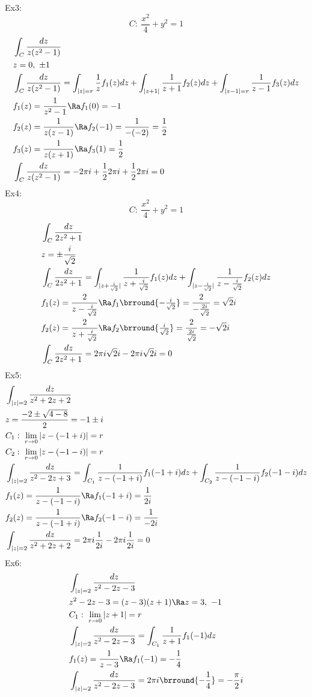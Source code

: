 Ex3:
\[
C:\ \frac{x^2}{4}+y^2=1
\]
\begin{align*}
    &\int_C\frac{dz}{z(z^2-1)}\\
    &z=0,\ \pm1\\
    &\int_C\frac{dz}{z(z^2-1)}=\int_{|z|=r}\frac{1}{z}f_1(z)dz+\int_{|z+1|}\frac{1}{z+1}f_2(z)dz+\int_{|z-1|=r}\frac{1}{z-1}f_3(z)dz\\
    &f_1(z)=\frac{1}{z^2-1}\Ra f_1(0)=-1\\
    &f_2(z)=\frac{1}{z(z-1)}\Ra f_2(-1)=\frac{1}{-(-2)}=\frac{1}{2}\\
    &f_3(z)=\frac{1}{z(z+1)}\Ra f_3(1)=\frac{1}{2}\\
    &\int_C\frac{dz}{z(z^2-1)}=-2\pi i+\frac{1}{2}2\pi i+\frac{1}{2}2\pi i=0
\end{align*}
Ex4:
\[
C:\ \frac{x^2}{4}+y^2=1
\]
\begin{align*}
    &\int_C\frac{dz}{2z^2+1}\\
    &z=\pm\frac{i}{\sqrt{2}}\\
    &\int_C\frac{dz}{2z^2+1}=\int_{|z+\frac{i}{\sqrt{2}}|}\frac{1}{z+\frac{i}{\sqrt{2}}}f_1(z)dz+\int_{|z-\frac{i}{\sqrt{2}}|}\frac{1}{z-\frac{i}{\sqrt{2}}}f_2(z)dz\\
    &f_1(z)=\frac{2}{z-\frac{i}{\sqrt{2}}}\Ra f_1\brround{-\tfrac{i}{\sqrt{2}}}=\frac{2}{-\frac{2i}{\sqrt{2}}}=\sqrt{2}i\\
    &f_2(z)=\frac{2}{z+\frac{i}{\sqrt{2}}}\Ra f_2\brround{\tfrac{i}{\sqrt{2}}}=\frac{2}{\frac{2i}{\sqrt{2}}}=-\sqrt{2}i\\
    &\int_C\frac{dz}{2z^2+1}=2\pi i\sqrt{2}i-2\pi i\sqrt{2}i=0
\end{align*}
Ex5:
\begin{align*}
    &\int_{|z|=2}\frac{dz}{z^2+2z+2}\\
    &z=\frac{-2\pm\sqrt{4-8}}{2}=-1\pm i\\
    &C_1:\ \lim_{r\to0}|z-(-1+i)|=r\\
    &C_2:\ \lim_{r\to0}|z-(-1-i)|=r\\
    &\int_{|z|=2}\frac{dz}{z^2-2z+3}=\int_{C_1}\frac{1}{z-(-1+i)}f_1(-1+i)dz+\int_{C_2}\frac{1}{z-(-1-i)}f_2(-1-i)dz\\
    &f_1(z)=\frac{1}{z-(-1-i)}\Ra f_1(-1+i)=\frac{1}{2i}\\
    &f_2(z)=\frac{1}{z-(-1+i)}\Ra f_2(-1-i)=\frac{1}{-2i}\\
    &\int_{|z|=2}\frac{dz}{z^2+2z+2}=2\pi i\frac{1}{2i}-2\pi i\frac{1}{2i}=0
\end{align*}
Ex6:
\begin{align*}
    &\int_{|z|=2}\frac{dz}{z^2-2z-3}\\
    &z^2-2z-3=(z-3)(z+1)\Ra z=3,\ -1\\
    &C_1:\ \lim_{r\to0}|z+1|=r\\
    &\int_{|z|=2}\frac{dz}{z^2-2z-3}=\int_{C_1}\frac{1}{z+1}f_1(-1)dz\\
    &f_1(z)=\frac{1}{z-3}\Ra f_1(-1)=-\frac{1}{4}\\
    &\int_{|z|=2}\frac{dz}{z^2-2z-3}=2\pi i\brround{-\frac{1}{4}}=-\frac{\pi}{2}i
\end{align*}
